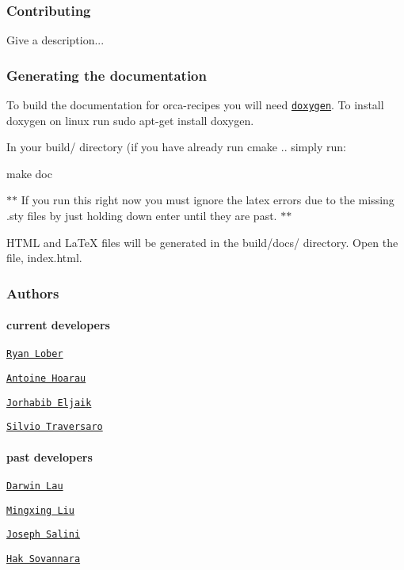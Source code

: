 \subsubsection*{Contributing}

Give a description...

\subsubsection*{Generating the documentation}

To build the documentation for {\ttfamily orca-\/recipes} you will need \href{http://www.stack.nl/~dimitri/doxygen/index.html}{\tt {\ttfamily doxygen}}. To install {\ttfamily doxygen} on linux run {\ttfamily sudo apt-\/get install doxygen}.

In your {\ttfamily build/} directory (if you have already run {\ttfamily cmake ..} simply run\+: 
\begin{DoxyCode}
make doc
\end{DoxyCode}
 $\ast$$\ast$ If you run this right now you must ignore the latex errors due to the missing {\ttfamily .sty} files by just holding down {\ttfamily enter} until they are past. $\ast$$\ast$

H\+T\+ML and La\+TeX files will be generated in the {\ttfamily build/docs/} directory. Open the file, {\ttfamily index.\+html}.

\subsubsection*{Authors}

\paragraph*{current developers}


\begin{DoxyItemize}
\item \href{https://github.com/rlober}{\tt Ryan Lober}
\item \href{https://github.com/ahoarau}{\tt Antoine Hoarau}
\item \href{https://github.com/jeljaik}{\tt Jorhabib Eljaik}
\item \href{https://github.com/traversaro}{\tt Silvio Traversaro}
\end{DoxyItemize}

\paragraph*{past developers}


\begin{DoxyItemize}
\item \href{https://github.com/darwinlau}{\tt Darwin Lau}
\item \href{https://github.com/mingxing-liu}{\tt Mingxing Liu}
\item \href{https://github.com/salini}{\tt Joseph Salini}
\item \href{https://github.com/sovannara-hak}{\tt Hak Sovannara} 
\end{DoxyItemize}